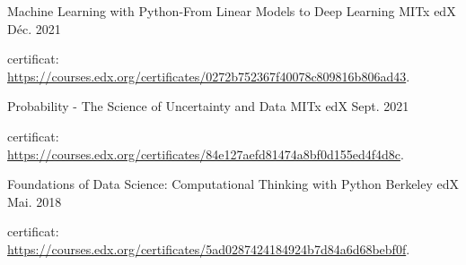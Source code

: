 


\begin{cventries}



\cventry
{Machine Learning with Python-From Linear Models to Deep Learning} %
{MITx} %
{edX} %
{Déc. 2021} %
{ %
\begin{cvitems}
\item {certificat: \url{https://courses.edx.org/certificates/0272b752367f40078c809816b806ad43}.}
\end{cvitems}
}


\cventry
{Probability - The Science of Uncertainty and Data} %
{MITx} %
{edX} %
{Sept. 2021} %
{ %
\begin{cvitems}
\item {certificat: \url{https://courses.edx.org/certificates/84e127aefd81474a8bf0d155ed4f4d8c}.}
\end{cvitems}
}


\cventry
{Foundations of Data Science: Computational Thinking with Python} %
{Berkeley} %
{edX} %
{Mai. 2018} %
{ %
\begin{cvitems}
\item {certificat: \url{https://courses.edx.org/certificates/5ad0287424184924b7d84a6d68bebf0f}.}
\end{cvitems}
}


\end{cventries}
